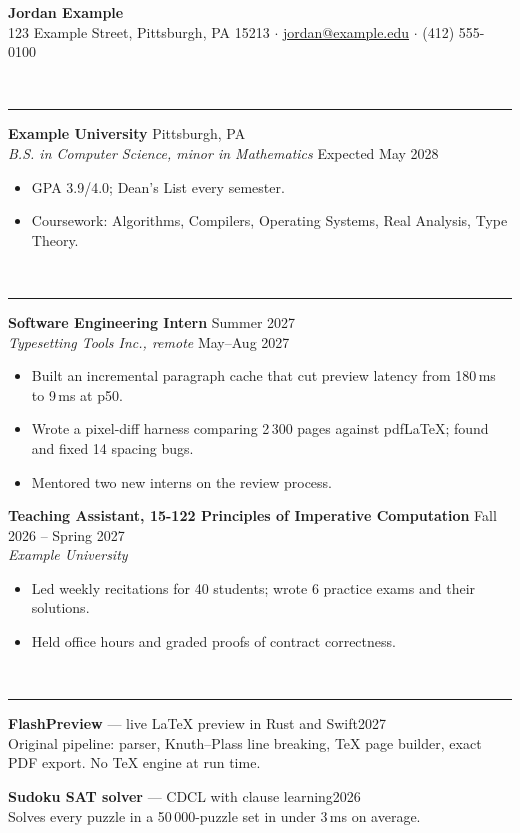 \documentclass[11pt]{article}
\newcommand{\cvsection}[1]{\vspace{6pt}{\large\bfseries #1}\\[-6pt]\rule{\textwidth}{0.6pt}\vspace{2pt}}
\newcommand{\entry}[4]{\textbf{#1} \hfill #2\\ \textit{#3} \hfill #4}
\begin{document}
\begin{center}
  {\LARGE\bfseries Jordan Example}\\[4pt]
  123 Example Street, Pittsburgh, PA 15213 \quad $\cdot$ \quad
  \href{mailto:jordan@example.edu}{jordan@example.edu} \quad $\cdot$ \quad
  (412) 555-0100
\end{center}

\cvsection{Education}

\entry{Example University}{Pittsburgh, PA}{B.S. in Computer Science, minor in Mathematics}{Expected May 2028}
\begin{itemize}[nosep,leftmargin=1.5em]
  \item GPA 3.9/4.0; Dean's List every semester.
  \item Coursework: Algorithms, Compilers, Operating Systems, Real Analysis, Type Theory.
\end{itemize}

\cvsection{Experience}

\entry{Software Engineering Intern}{Summer 2027}{Typesetting Tools Inc., remote}{May--Aug 2027}
\begin{itemize}[nosep,leftmargin=1.5em]
  \item Built an incremental paragraph cache that cut preview latency from 180\,ms to 9\,ms at p50.
  \item Wrote a pixel-diff harness comparing 2\,300 pages against pdfLaTeX; found and fixed 14 spacing bugs.
  \item Mentored two new interns on the review process.
\end{itemize}

\entry{Teaching Assistant, 15-122 Principles of Imperative Computation}{Fall 2026 -- Spring 2027}{Example University}{}
\begin{itemize}[nosep,leftmargin=1.5em]
  \item Led weekly recitations for 40 students; wrote 6 practice exams and their solutions.
  \item Held office hours and graded proofs of contract correctness.
\end{itemize}

\cvsection{Projects}

\textbf{FlashPreview} --- live \LaTeX{} preview in Rust and Swift\hfill 2027\\
Original pipeline: parser, Knuth--Plass line breaking, TeX page builder, exact PDF export. No TeX engine at run time.

\textbf{Sudoku SAT solver} --- CDCL with clause learning\hfill 2026\\
Solves every puzzle in a 50\,000-puzzle set in under 3\,ms on average.
\end{document}
